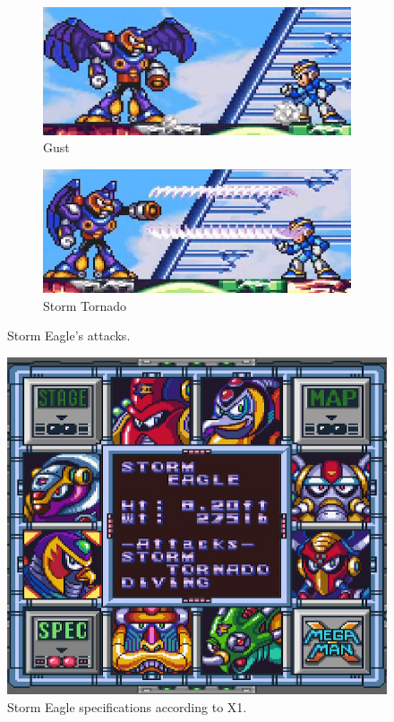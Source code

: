 \begin{figure}[htp]
\begin{subfigure}{0.35\linewidth}
	\end{subfigure}
 	\begin{subfigure}{0.4\linewidth}
 		\centering
 		\includegraphics[width=\linewidth]{figures/X1/Storm_eagle/Eagle_push.jpg}
 		\caption{Gust}
 	\end{subfigure}
 	\begin{subfigure}{0.4\linewidth}
 		\centering
 		\includegraphics[width=\linewidth]{figures/X1/Storm_eagle/Eagle_tornado.jpg}
 		\caption{Storm Tornado}
 	\end{subfigure}
 	\caption{Storm Eagle's attacks.}
 \end{figure}
 \begin{figure}[htp]
	\centering
	\includegraphics[width=0.4\linewidth]{figures/X1/Storm_eagle/Storm_eagle_specs.png}
	\caption{Storm Eagle specifications according to X1.}
\end{figure}


